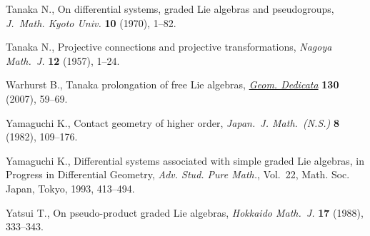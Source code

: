 \documentclass[pdftex]{sigma}
\numberwithin{equation}{section}
\numberwithin{theorem}{section}
\numberwithin{proposition}{section}
\numberwithin{lemma}{section}
\numberwithin{corollary}{section}
\numberwithin{definition}{section}
\numberwithin{example}{section}
\numberwithin{remark}{section}
\numberwithin{note}{section}
\begin{document}
\begin{thebibliography}{99}
Tanaka N., On dif\/ferential systems, graded {L}ie algebras and pseudogroups,
  \textit{J.~Math. Kyoto Univ.} \textbf{10} (1970), 1--82.

Tanaka N., Projective connections and projective transformations,
  \textit{Nagoya Math.~J.} \textbf{12} (1957), 1--24.

Warhurst B., Tanaka prolongation of free {L}ie algebras, \href{http://dx.doi.org/10.1007/s10711-007-9205-1}{\textit{Geom.
  Dedicata}} \textbf{130} (2007), 59--69.

Yamaguchi K., Contact geometry of higher order, \textit{Japan.~J. Math.~(N.S.)}
  \textbf{8} (1982), 109--176.

Yamaguchi K., Dif\/ferential systems associated with simple graded {L}ie
  algebras, in Progress in Dif\/ferential Geometry, \textit{Adv. Stud. Pure
  Math.}, Vol.~22, Math. Soc. Japan, Tokyo, 1993, 413--494.

Yatsui T., On pseudo-product graded {L}ie algebras, \textit{Hokkaido Math.~J.}
  \textbf{17} (1988), 333--343.

\end{thebibliography}\LastPageEnding
\end{document}
